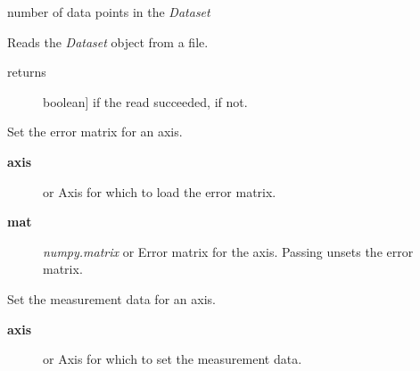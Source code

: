 \documentclass[a4paper,10pt,english]{sphinxmanual}
\begin{document}
\begin{fulllineitems}
\begin{fulllineitems}
\end{fulllineitems}


\begin{fulllineitems}
\label{index:kafe.dataset.Dataset.n_datapoints}
number of data points in the \emph{Dataset}

\end{fulllineitems}


\begin{fulllineitems}
\label{index:kafe.dataset.Dataset.read_from_file}
Reads the \emph{Dataset} object from a file.
\begin{description}
\item[{returns}] \leavevmode{[}boolean{]}
 if the read succeeded,  if not.

\end{description}

\end{fulllineitems}


\begin{fulllineitems}
\label{index:kafe.dataset.Dataset.set_cov_mat}
Set the error matrix for an axis.
\begin{description}
\item[{\textbf{axis}}] \leavevmode{[} or \code{'y'}{]}
Axis for which to load the error matrix.

\item[{\textbf{mat}}] \leavevmode{[}\emph{numpy.matrix} or \code{None}{]}
Error matrix for the axis. Passing  unsets the error
matrix.

\end{description}

\end{fulllineitems}


\begin{fulllineitems}
\label{index:kafe.dataset.Dataset.set_data}
Set the measurement data for an axis.
\begin{description}
\item[{\textbf{axis}}] \leavevmode{[} or \code{'y'}{]}
Axis for which to set the measurement data.


\end{description}
\end{fulllineitems}
\end{fulllineitems}
\end{document}
